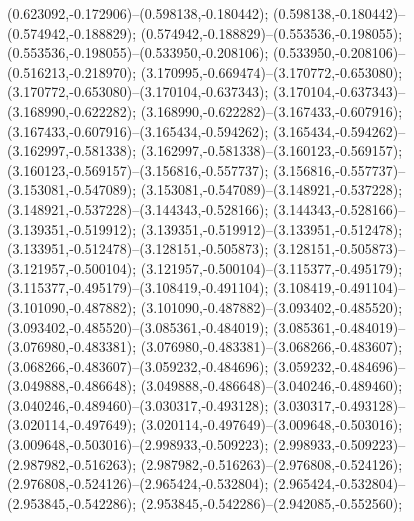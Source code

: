  (0.623092,-0.172906)--(0.598138,-0.180442);
 (0.598138,-0.180442)--(0.574942,-0.188829);
 (0.574942,-0.188829)--(0.553536,-0.198055);
 (0.553536,-0.198055)--(0.533950,-0.208106);
 (0.533950,-0.208106)--(0.516213,-0.218970);
 (3.170995,-0.669474)--(3.170772,-0.653080);
 (3.170772,-0.653080)--(3.170104,-0.637343);
 (3.170104,-0.637343)--(3.168990,-0.622282);
 (3.168990,-0.622282)--(3.167433,-0.607916);
 (3.167433,-0.607916)--(3.165434,-0.594262);
 (3.165434,-0.594262)--(3.162997,-0.581338);
 (3.162997,-0.581338)--(3.160123,-0.569157);
 (3.160123,-0.569157)--(3.156816,-0.557737);
 (3.156816,-0.557737)--(3.153081,-0.547089);
 (3.153081,-0.547089)--(3.148921,-0.537228);
 (3.148921,-0.537228)--(3.144343,-0.528166);
 (3.144343,-0.528166)--(3.139351,-0.519912);
 (3.139351,-0.519912)--(3.133951,-0.512478);
 (3.133951,-0.512478)--(3.128151,-0.505873);
 (3.128151,-0.505873)--(3.121957,-0.500104);
 (3.121957,-0.500104)--(3.115377,-0.495179);
 (3.115377,-0.495179)--(3.108419,-0.491104);
 (3.108419,-0.491104)--(3.101090,-0.487882);
 (3.101090,-0.487882)--(3.093402,-0.485520);
 (3.093402,-0.485520)--(3.085361,-0.484019);
 (3.085361,-0.484019)--(3.076980,-0.483381);
 (3.076980,-0.483381)--(3.068266,-0.483607);
 (3.068266,-0.483607)--(3.059232,-0.484696);
 (3.059232,-0.484696)--(3.049888,-0.486648);
 (3.049888,-0.486648)--(3.040246,-0.489460);
 (3.040246,-0.489460)--(3.030317,-0.493128);
 (3.030317,-0.493128)--(3.020114,-0.497649);
 (3.020114,-0.497649)--(3.009648,-0.503016);
 (3.009648,-0.503016)--(2.998933,-0.509223);
 (2.998933,-0.509223)--(2.987982,-0.516263);
 (2.987982,-0.516263)--(2.976808,-0.524126);
 (2.976808,-0.524126)--(2.965424,-0.532804);
 (2.965424,-0.532804)--(2.953845,-0.542286);
 (2.953845,-0.542286)--(2.942085,-0.552560);
